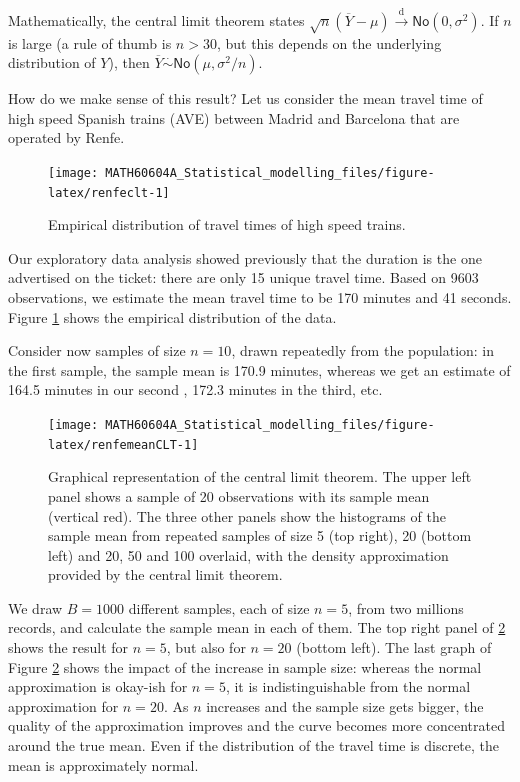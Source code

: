 \documentclass[
  11pt,
  letterpaper,
]{book}
\theoremstyle{definition}
\theoremstyle{definition}
\theoremstyle{definition}
\theoremstyle{remark}
\begin{document}
Mathematically, the central limit theorem states \(\sqrt{n}(\overline{Y}-\mu) \stackrel{\mathrm{d}}{\rightarrow} \mathsf{No}(0, \sigma^2)\). If \(n\) is large (a rule of thumb is \(n>30\), but this depends on the underlying distribution of \(Y\)), then \(\overline{Y} \stackrel{\cdot}{\sim} \mathsf{No}(\mu, \sigma^2/n)\).

How do we make sense of this result? Let us consider the mean travel time of high speed Spanish trains (AVE) between Madrid and Barcelona that are operated by Renfe.

\begin{figure}

{\centering \texttt{[image: MATH60604A\_Statistical\_modelling\_files/figure-latex/renfeclt-1]} 

}

\caption{Empirical distribution of travel times of high speed trains.}\label{fig:renfeclt}
\end{figure}

Our exploratory data analysis showed previously that the duration is the one advertised on the ticket: there are only 15 unique travel time. Based on 9603 observations, we estimate the mean travel time to be 170 minutes and 41 seconds. Figure \ref{fig:renfeclt} shows the empirical distribution of the data.

Consider now samples of size \(n=10\), drawn repeatedly from the population: in the first sample, the sample mean is 170.9 minutes, whereas we get an estimate of 164.5 minutes in our second , 172.3 minutes in the third, etc.

\begin{figure}

{\centering \texttt{[image: MATH60604A\_Statistical\_modelling\_files/figure-latex/renfemeanCLT-1]} 

}

\caption{Graphical representation of the central limit theorem. The upper left panel shows a sample of 20 observations with its sample mean (vertical red). The three other panels show the histograms of the sample mean from repeated samples of size 5 (top right), 20 (bottom left) and 20, 50 and 100 overlaid, with the density approximation provided by the central limit theorem.}\label{fig:renfemeanCLT}
\end{figure}

We draw \(B=1000\) different samples, each of size \(n=5\), from two millions records, and calculate the sample mean in each of them. The top right panel of \ref{fig:renfemeanCLT} shows the result for \(n=5\), but also for \(n=20\) (bottom left). The last graph of Figure \ref{fig:renfemeanCLT} shows the impact of the increase in sample size: whereas the normal approximation is okay-ish for \(n=5\), it is indistinguishable from the normal approximation for \(n=20\). As \(n\) increases and the sample size gets bigger, the quality of the approximation improves and the curve becomes more concentrated around the true mean. Even if the distribution of the travel time is discrete, the mean is approximately normal.
\end{document}

